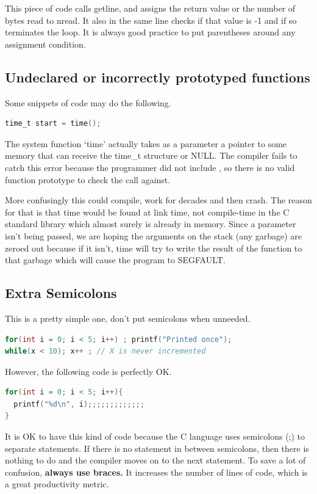 This piece of code calls getline, and assigns the return value or the number of bytes read to nread.
It also in the same line checks if that value is -1 and if so terminates the loop.
It is always good practice to put parentheses around any assignment condition.

\subsection{Undeclared or incorrectly prototyped functions}

Some snippets of code may do the following.

\begin{lstlisting}[language=C]
time_t start = time();
\end{lstlisting}

The system function `time' actually takes as a parameter a pointer to some memory that can receive the time\_t structure or NULL.
The compiler fails to catch this error because the programmer did not include , so there is no valid function prototype to check the call against.

More confusingly this could compile, work for decades and then crash.
The reason for that is that time would be found at link time, not compile-time in the C standard library which almost surely is already in memory.
Since a parameter isn't being passed, we are hoping the arguments on the stack (any garbage) are zeroed out because if it isn't, time will try to write the result of the function to that garbage which will cause the program to SEGFAULT.

\subsection{Extra Semicolons}

This is a pretty simple one, don't put semicolons when unneeded.

\begin{lstlisting}[language=C]
for(int i = 0; i < 5; i++) ; printf("Printed once");
while(x < 10); x++ ; // X is never incremented
\end{lstlisting}

However, the following code is perfectly OK.

\begin{lstlisting}[language=C]
for(int i = 0; i < 5; i++){
  printf("%d\n", i);;;;;;;;;;;;;
}
\end{lstlisting}

It is OK to have this kind of code because the C language uses semicolons (;) to separate statements.
If there is no statement in between semicolons, then there is nothing to do and the compiler moves on to the next statement.
To save a lot of confusion, \textbf{always use braces.}
It increases the number of lines of code, which is a great productivity metric.


